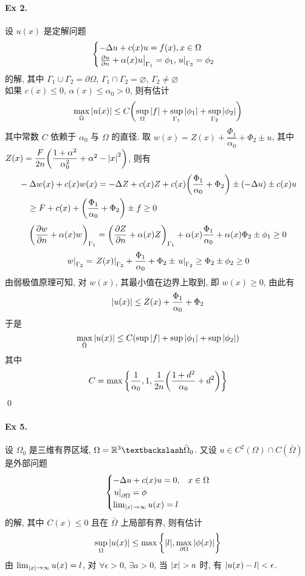 \paragraph{Ex 2.}
设 $u(x)$ 是定解问题
\[ \begin{cases}
-\Delta u + c(x) u = f(x), x \in \Omega \\
{\left.{{\frac{\partial {u}}{\partial {n}}} + \alpha(x)u} \right|}_{\Gamma_1} = \phi_1,
{\left.{u} \right|}_{\Gamma_2} = \phi_2
\end{cases} \]
的解, 其中 $\Gamma_1 \cup \Gamma_2 = \partial\Omega$,
$\Gamma_1 \cap \Gamma_2 = \varnothing$, $\Gamma_2 \neq \varnothing$ \\
如果 $c(x) \leq 0$, $\alpha(x) \leq \alpha_0 > 0$, 则有估计
\[ \max_{\bar\Omega} {\lvert {u(x)} \rvert} \leq C{\left( {
	\sup_{\Omega}{\lvert {f} \rvert}+\sup_{\Gamma_1}{\lvert {\phi_1} \rvert}+\sup_{\Gamma_2}{\lvert {\phi_2} \rvert}
} \right)} \]
其中常数 $C$ 依赖于 $\alpha_0$ 与 $\Omega$ 的直径.
\solution
取 $w(x) = Z(x) + \dfrac{\Phi_1}{\alpha_0} + \Phi_2 \pm u$, 其中
$Z(x)=\dfrac F{2n}{\left( {\dfrac{1+\alpha^2}{\alpha_0^2}+\alpha^2-{\lvert {x} \rvert}^2} \right)}$,
则有 
\[ \begin{aligned}
&-\Delta w(x) + c(x)w(x) = -\Delta Z+c(x)Z+c(x){\left( {
	\dfrac{\Phi_1}{\alpha_0} + \Phi_2
} \right)} \pm (-\Delta u) \pm c(x)u \\
&\quad \geq F + c(x) + {\left( {
	\dfrac{\Phi_1}{\alpha_0} + \Phi_2
} \right)} \pm f \geq 0
\end{aligned} \]
\[
{\left( {{\frac{\partial {w}}{\partial {n}}}+\alpha(x)w} \right)}_{\Gamma_1}
={\left( {{\frac{\partial {Z}}{\partial {n}}}+\alpha(x)Z} \right)}_{\Gamma_1}
+\alpha(x)\frac{\Phi_1}{\alpha_0} + \alpha(x)\Phi_2 \pm \phi_1 \geq 0
\]
\[
{\left.{w} \right|}_{\Gamma_2}={\left.{Z(x)} \right|}_{\Gamma_2}+\frac{\Phi_1}{\alpha_0}+\Phi_2
\pm {\left.{u} \right|}_{\Gamma_2} \geq \Phi_2 \pm \phi_2 \geq 0
\]
由弱极值原理可知, 对 $w(x)$, 其最小值在边界上取到, 即 $w(x) \geq 0$, 由此有
\[{\lvert {u(x)} \rvert} \leq Z(x) + \frac{\Phi_1}{\alpha_0} + \Phi_2\]
于是
\[\max_{\bar\Omega} {\lvert {u(x)} \rvert} \leq C{\left( {
	\sup{\lvert {f} \rvert}+\sup{\lvert {\phi_1} \rvert}+\sup{\lvert {\phi_2} \rvert}
} \right)} \]
其中
\[ C = \max{\left\{ {
	\frac 1{\alpha_0}, 1, \frac 1{2n}{\left( {\frac{1+d^2}{\alpha_0} + d^2} \right)}
} \right\}} \]
\qed

\paragraph{Ex 5.}
设 $\Omega_0$ 是三维有界区域, $\Omega = \mreal^3\textbackslash\bar\Omega_0$. 又设
$u \in C^2(\Omega) \cap C(\bar\Omega)$ 是外部问题
\[ \begin{cases}
-\Delta u + c(x) u = 0, & x \in \Omega \\
{\left.{u} \right|}_{\partial\Omega} = \phi \\
\lim_{{\lvert {x} \rvert} \to \infty} u(x) = l
\end{cases} \]
的解, 其中 $C(x) \leq 0$ 且在 $\bar\Omega$ 上局部有界, 则有估计
\[ \sup_{\Omega} {\lvert {u(x)} \rvert} \leq \max {\left\{ {
	{\lvert {l} \rvert}, \max_{\partial\Omega} {\lvert {\phi(x)} \rvert}
} \right\}} \]
\solution
由 $\lim_{{\lvert {x} \rvert} \to \infty} u(x) = l$, 对 $\forall\epsilon>0$, $\exists a>0$,
当 ${\lvert {x} \rvert}>a$ 时, 有 ${\lvert {u(x)-l} \rvert}<\epsilon$.

